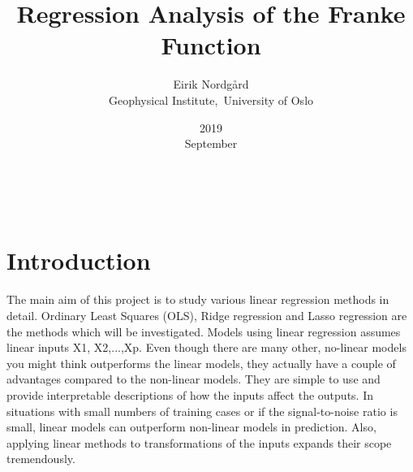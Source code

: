\documentclass[a4paper,11pt,twocolumn]{article}
\begin{document}
\title{Regression Analysis of the Franke Function}
\date{2019\\ September}
\author{Eirik Nordgård\\ Geophysical Institute,\ University of Oslo}


\

\section{Introduction}

The main aim of this project is to study various linear regression methods in detail. Ordinary Least Squares (OLS), Ridge regression and Lasso regression are the methods which will be investigated. Models using linear regression assumes linear inputs X1, X2,...,Xp. Even though there are many other, no-linear models you might think outperforms the linear models, they actually have a couple of advantages compared to the non-linear models. They are simple to use and provide interpretable descriptions of how the inputs affect the outputs. In situations with small numbers of training cases or if the signal-to-noise ratio is small, linear models can outperform non-linear models in prediction. Also, applying linear methods to transformations of the inputs expands their scope tremendously\cite{Hastie}.
\\
\\
\\
\\
\end{document}
